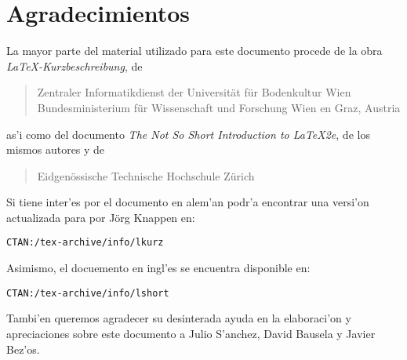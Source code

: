 \chapter{Agradecimientos}
\noindent La mayor parte del material utilizado para este documento
procede de la obra \emph{\LaTeX-Kurzbeschreibung}, de
\begin{verse}
%
{Zentraler Informatikdienst der Universit\"at f\"ur Bodenkultur Wien}
%
   {Bundesministerium f\"ur Wissenschaft und Forschung Wien}
%
   {en Graz, Austria}
\end{verse}

\noindent as'i como del documento \emph{The Not So Short Introduction
  to \LaTeX2e}, de los mismos autores y de

\begin{verse}
%
{Eidgen\"ossische Technische Hochschule Z\"urich}
\end{verse}

Si tiene inter'es por el documento en alem'an podr'a encontrar una
versi'on actualizada para \LaTeXe{} por J\"org Knappen en:

\centerline{\texttt{CTAN:/tex-archive/info/lkurz}}

Asimismo, el docuemento en ingl'es se encuentra disponible en:

\centerline{\texttt{CTAN:/tex-archive/info/lshort}}


\vspace{8ex}
Tambi'en queremos agradecer su desinterada ayuda en la elaboraci'on y
apreciaciones sobre este documento a
Julio S'anchez, David Bausela y Javier Bez'os.


\pagebreak
\endinput
